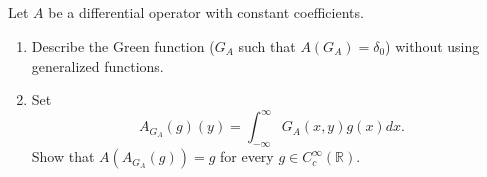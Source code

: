 \documentclass[11pt, reqno,a4paper, twoside]{amsproc}
\newcommand{\dbR}{\mathbb R}
\begin{document}
\subsection{}Let $A$ be a differential operator with constant coefficients. 
\begin{enumerate}
\item Describe the Green function ($G_A$ such that $A(G_A)=\delta_0$) without using generalized functions.
\item Set \[A_{G_A}(g)(y)=\int_{-\infty}^\infty G_A(x,y)g(x)dx.\]
Show that $A(A_{G_A}(g))=g$ for every $g\in C_c^\infty(\dbR)$. 

\end{enumerate}
\end{document}
